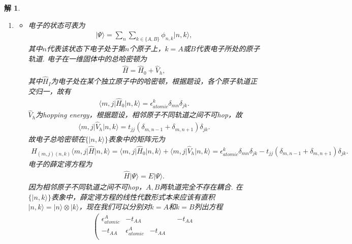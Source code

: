 \documentclass[UTF8,10pt,a4paper]{article}
\theoremstyle{Problem}
\theoremstyle{Solution}
\newtheorem*{sol}{解}
\begin{document}
\begin{sol}
    \begin{enumerate}
        \item[(a)]
	\begin{itemize}
        \item[$\triangleright$] 电子的状态可表为
        \begin{align}
            \lvert\Psi\rangle=\sum_{n}\sum_{k\in\{A,B\}}\phi_{n,k}\lvert n,k\rangle,
        \end{align}
        其中$n$代表该状态下电子处于第$n$个原子上，$k=A$或$B$代表电子所处的原子轨道. 电子在一维固体中的总哈密顿为
        \begin{align}
            \hat{H}=\hat{H}_0+\hat{V}_h,
        \end{align}
        其中$\hat{H}_I$为电子处在某个独立原子中的哈密顿，根据题设，各个原子轨道正交归一，故有
        \begin{align}
            \langle m,j\rvert\hat{H}_0\lvert n,k\rangle=\epsilon_{atomic}^k\delta_{mn}\delta_{jk}.
        \end{align}
        $\hat{V}_h$为hopping energy，根据题设，相邻原子不同轨道之间不可hop，故
        \begin{align}
            \langle m,j\rvert\hat{V}_h\lvert n,k\rangle=t_{jj}(\delta_{m,n-1}+\delta_{m,n+1})\delta_{jk}.
        \end{align}
        故电子总哈密顿在$\{\lvert n,k\rangle\}$表象中的矩阵元为
        \begin{align}
            H_{(m,j)(n,k)}\langle m,j\rvert\hat{H}\lvert n,k\rangle=\langle m,j\rvert\hat{H}_0\lvert n,k\rangle+\langle m,j\rvert\hat{V}_h\lvert n,k\rangle=\epsilon_{atomic}^k\delta_{mn}\delta_{jk}-t_{jj}(\delta_{m,n-1}+\delta_{m,n+1})\delta_{jk}.
        \end{align}
        电子的薛定谔方程为
        \begin{align}
            \hat{H}\lvert\Psi\rangle=E\lvert\Psi\rangle.
        \end{align}
        因为相邻原子不同轨道之间不可hop，$A,B$两轨道完全不存在耦合. 在$\{\lvert n,k\rangle\}$表象中，薛定谔方程的线性代数形式本来应该有直积$\lvert n,k\rangle=\lvert n\rangle\otimes\lvert k\rangle$，现在我们可以分别对$k=A$和$k=B$列出方程
        \begin{align}
            \left(\begin{matrix}
                \epsilon_{atomic}^A & -t_{AA} &  &  & -t_{AA} \\
                -t_{AA} & \epsilon_{atomic}^A & -t_{AA} &  &  \\

\end{matrix}
\end{align}
\end{itemize}
\end{enumerate}
\end{sol}
\end{document}
